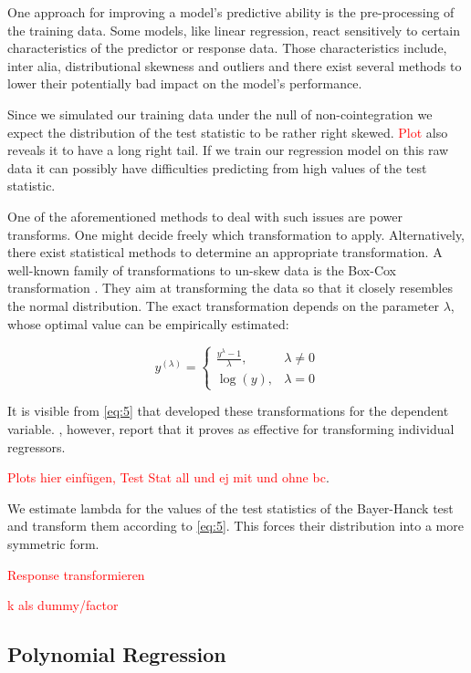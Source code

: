 \documentclass[12pt,a4paper]{article}
\begin{document}
One approach for improving a model's predictive ability is the
pre-processing of the training data. Some models, like linear
regression, react sensitively to certain characteristics of the
predictor or response data. Those characteristics include, inter alia,
distributional skewness and outliers and there exist several methods to
lower their potentially bad impact on the model's performance.

Since we simulated our training data under the null of non-cointegration
we expect the distribution of the test statistic to be rather right
skewed. \textcolor{red}{Plot} also reveals it to have a long right tail.
If we train our regression model on this raw data it can possibly have
difficulties predicting from high values of the test statistic.

One of the aforementioned methods to deal with such issues are power
transforms. One might decide freely which transformation to apply.
Alternatively, there exist statistical methods to determine an
appropriate transformation. A well-known family of transformations to
un-skew data is the Box-Cox transformation \autocite{Boxcox_1964}. They
aim at transforming the data so that it closely resembles the normal
distribution. The exact transformation depends on the parameter
\(\lambda\), whose optimal value can be empirically estimated:

\begin{equation}
y^{(\lambda)} =
    \begin{cases}
    \frac{y^{\lambda} - 1}{\lambda}, & \lambda \neq 0 \\
    \log{(y)}, & \lambda = 0
    \end{cases}
\label{eq:5}
\end{equation}

It is visible from \eqref{eq:5} that \textcite{Boxcox_1964} developed
these transformations for the dependent variable. \textcite{Kuhn_2013},
however, report that it proves as effective for transforming individual
regressors.

\textcolor{red}{Plots hier einfügen, Test Stat all und ej mit und ohne bc}.

We estimate lambda for the values of the test statistics of the
Bayer-Hanck test and transform them according to \eqref{eq:5}. This
forces their distribution into a more symmetric form.

\textcolor{red}{Response transformieren}

\textcolor{red}{k als dummy/factor}

\hypertarget{polynomial-regression}{%
\subsection{Polynomial Regression}\label{polynomial-regression}}
\end{document}
